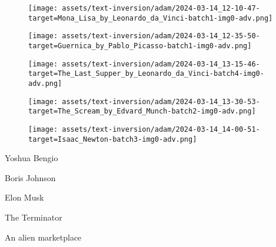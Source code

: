\begin{figure*}[]
\begin{minipage}[t]{.025\textwidth}
     \vspace{0pt}
\end{minipage}%
\hspace{1ex}
\begin{minipage}[t]{0.98\figwidth}
    \vspace{0pt}
    \begin{subfigure}[t]{0.2\textwidth}
        \texttt{[image: assets/text-inversion/adam/2024-03-14\_12-10-47-target=Mona\_Lisa\_by\_Leonardo\_da\_Vinci-batch1-img0-adv.png]}
    \end{subfigure}%
    \begin{subfigure}[t]{0.2\textwidth}
        \texttt{[image: assets/text-inversion/adam/2024-03-14\_12-35-50-target=Guernica\_by\_Pablo\_Picasso-batch1-img0-adv.png]}
    \end{subfigure}%
    \begin{subfigure}[t]{0.2\textwidth}
        \texttt{[image: assets/text-inversion/adam/2024-03-14\_13-15-46-target=The\_Last\_Supper\_by\_Leonardo\_da\_Vinci-batch4-img0-adv.png]}
    \end{subfigure}%
    \begin{subfigure}[t]{0.2\textwidth}
        \texttt{[image: assets/text-inversion/adam/2024-03-14\_13-30-53-target=The\_Scream\_by\_Edvard\_Munch-batch2-img0-adv.png]}
    \end{subfigure}%
    \begin{subfigure}[t]{0.2\textwidth}
        \texttt{[image: assets/text-inversion/adam/2024-03-14\_14-00-51-target=Isaac\_Newton-batch3-img0-adv.png]}
    \end{subfigure}%
\end{minipage}

\begin{minipage}[t]{.025\textwidth}
     \vspace{0pt}
\end{minipage}%
\hspace{1ex}%
\begin{minipage}[t]{0.98\figwidth}
    \vspace{1mm}
    \begin{minipage}[t]{0.2\textwidth}
        \centering
        Yoshua Bengio
    \end{minipage}%
    \begin{minipage}[t]{0.2\textwidth}
        \centering
        Boris Johnson
    \end{minipage}%
    \begin{minipage}[t]{0.2\textwidth}
        \centering
        Elon Musk
    \end{minipage}%
    \begin{minipage}[t]{0.2\textwidth}
        \centering
        The Terminator
    \end{minipage}%
    \begin{minipage}[t]{0.2\textwidth}
        \centering
        An alien marketplace
    \end{minipage}%
\end{minipage}


\end{figure*}
